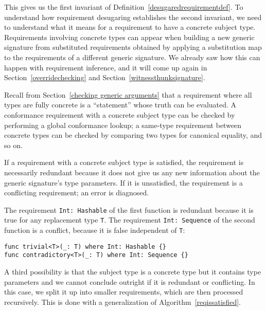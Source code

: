 \documentclass[../generics]{subfiles}
\begin{document}
This gives us the first invariant of Definition~\ref{desugaredrequirementdef}. To understand how requirement desugaring establishes the second invariant, we need to understand what it means for a requirement to have a concrete subject type. Requirements involving concrete types can appear when building a new generic signature from substituted requirements obtained by applying a substitution map to the requirements of a different generic signature. We already saw how this can happen with requirement inference, and it will come up again in Section~\ref{overridechecking} and Section~\ref{witnessthunksignature}.

Recall from Section~\ref{checking generic arguments} that a requirement where all types are fully concrete is a ``statement'' whose truth can be evaluated. A conformance requirement with a concrete subject type can be checked by performing a global conformance lookup; a same-type requirement between concrete types can be checked by comparing two types for canonical equality, and so on.

If a requirement with a concrete subject type is satisfied, the requirement is necessarily redundant because it does not give us any new information about the generic signature's type parameters. If it is unsatisfied, the requirement is a conflicting requirement; an error is diagnosed.

\begin{example}
The requirement \texttt{Int:\ Hashable} of the first function is redundant because it is true for any replacement type \texttt{T}. The requirement \texttt{Int:\ Sequence} of the second function is a conflict, because it is false independent of \texttt{T}:
\begin{Verbatim}
func trivial<T>(_: T) where Int: Hashable {}
func contradictory<T>(_: T) where Int: Sequence {}
\end{Verbatim}
\end{example}

A third possibility is that the subject type is a concrete type but it contains type parameters and we cannot conclude outright if it is redundant or conflicting. In this case, we split it up into smaller requirements, which are then processed recursively. This is done with a generalization of Algorithm~\ref{reqissatisfied}.
\end{document}
